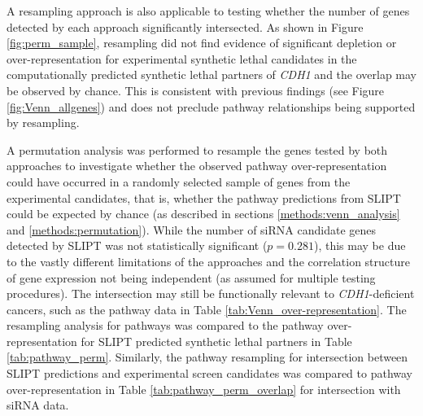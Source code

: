 A resampling approach is also applicable to testing whether the number of genes detected by each approach significantly intersected. As shown in Figure \ref{fig:perm_sample}, resampling did not find evidence of significant depletion or over-represent\-ation for experimental synthetic lethal candidates in the computationally predicted synthetic lethal partners of \textit{CDH1} and the overlap may be observed by chance. This is consistent with previous findings (see Figure \ref{fig:Venn_allgenes}) and does not preclude pathway relationships being supported by resampling.

A permutation analysis was performed to resample the genes tested by both approaches to investigate whether the observed pathway over-represent\-ation could have occurred in a randomly selected sample of genes from the experimental candidates, that is, whether the pathway predictions from SLIPT could be expected by chance (as described in sections \ref{methods:venn_analysis} and \ref{methods:permutation}).
While the number of siRNA candidate genes detected by SLIPT was not statistically significant ($p=0.281$), this may be due to the vastly different limitations of the approaches and the correlation structure of gene expression not being independent (as assumed for multiple testing procedures). The  intersection may still be functionally relevant to \textit{CDH1}-deficient cancers, such as the pathway data in Table \ref{tab:Venn_over-representation}. The resampling analysis for pathways was compared to the pathway over-represent\-ation for SLIPT predicted synthetic lethal partners in Table \ref{tab:pathway_perm}. Similarly, the pathway resampling for intersection between SLIPT predictions and experimental screen candidates was compared to pathway over-represent\-ation in Table \ref{tab:pathway_perm_overlap} for intersection with siRNA data.

